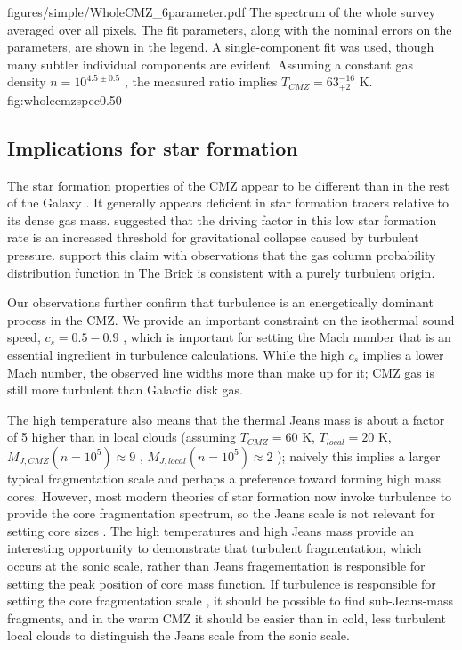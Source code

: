 \Figure
{figures/simple/WholeCMZ_6parameter.pdf}
{The spectrum of the whole survey averaged over all pixels.  The fit
parameters, along with the nominal errors on the parameters, are shown in the
legend.  A single-component fit was used, though many subtler individual
components are evident.  Assuming a constant gas density $n=10^{4.5\pm0.5}$
\percc, the measured ratio implies $T_{CMZ} = 63^{-16}_{+2}$ K.}
{fig:wholecmzspec}{0.5}{0}

\subsection{Implications for star formation}
The star formation properties of the CMZ appear to be different than in the
rest of the Galaxy
\citep{Yusef-Zadeh2009a,Yusef-Zadeh2010a,Immer2012a,Longmore2013b}.  It
generally appears deficient in star formation tracers relative to its dense gas
mass.  \citet{Kruijssen2014c} suggested that the driving factor in this low
star formation rate is an increased threshold for gravitational collapse caused
by turbulent pressure.  \citet{Rathborne2014b} support this claim with
observations that the gas column probability distribution function in The Brick
is consistent with a purely turbulent origin.

Our observations further confirm that turbulence is an energetically dominant
process in the CMZ.  We provide an important constraint on the isothermal sound
speed, $c_s = 0.5-0.9$ \kms, which is important for setting the Mach number that
is an essential ingredient in turbulence calculations.  While the high $c_s$ implies
a lower Mach number, the observed line widths more than make up for it; CMZ gas is still
more turbulent than Galactic disk gas.

The high temperature also means that the thermal Jeans mass is about a factor
of 5 higher than in local clouds (assuming $T_{CMZ}=60$ K, $T_{local}=20$ K,
$M_{J,CMZ}(n=10^5) \approx 9$ \msun, $M_{J,local}(n=10^5) \approx 2$ \msun);
naively this implies a larger typical fragmentation scale and perhaps a
preference toward forming high mass cores.  However, most modern theories of
star formation now invoke turbulence to provide the core fragmentation spectrum,
so the Jeans scale is not relevant for setting core sizes 
\citep{Krumholz2005c,Hennebelle2011a,Padoan2011b,Federrath2012a,Hennebelle2013a,Hopkins2013a}.
The high temperatures and high Jeans mass provide an interesting opportunity to
demonstrate that turbulent fragmentation, which occurs at the sonic scale,
rather than Jeans fragementation is responsible for setting the peak position
of core mass function.  If turbulence is responsible for setting the core
fragmentation scale \citep{Offner2013b,Hopkins2013a}, it
should be possible to find sub-Jeans-mass fragments, and in the warm CMZ it
should be easier than in cold, less turbulent local clouds to distinguish the
Jeans scale from the sonic scale.


